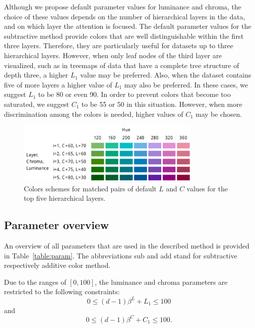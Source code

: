 \documentclass[journal]{vgtc}                %
\begin{document}
Although we propose default parameter values for luminance and chroma, the choice of these values depends on the number of hierarchical layers in the data, and on which layer the attention is focused. The default parameter values for the subtractive method provide colors that are well distinguishable within the first three layers. Therefore, they are particularly useful for datasets up to three hierarchical layers. However, when only leaf nodes of the third layer are visualized, such as in treemaps of data that have a complete tree structure of depth three, a higher $L_1$ value may be preferred. Also, when the dataset contains five of more layers a higher value of $L_1$ may also be preferred. In these cases, we suggest $L_1$ to be 80 or even 90. In order to prevent colors that become too saturated, we suggest $C_1$ to be 55 or 50 in this situation. However, when more discrimination among the colors is needed, higher values of $C_1$ may be chosen.

\begin{figure}[!t]
  \centering
  \includegraphics[width=3.5in]{LC3.pdf}
  \caption{Colors schemes for matched pairs of default $L$ and $C$ values for the top five hierarchical layers.}\label{fig:lc3}
\end{figure}



\subsection{Parameter overview}

An overview of all parameters that are used in the described method is provided in Table~\ref{table:param}. The abbreviations sub and add stand for subtractive respectively additive color method.

Due to the ranges of $[0, 100]$, the luminance and chroma parameters are restricted to the following constraints:
\begin{equation}
0 \leq (d-1)\beta^L + L_1 \leq 100
\end{equation}
and 
\begin{equation}
0 \leq (d-1)\beta^C + C_1 \leq 100.
\end{equation}
\end{document}
